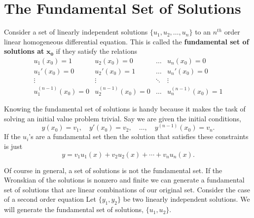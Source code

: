\section{The Fundamental Set of Solutions}
\label{section The Fundamental Set of Solutions}

Consider a set of linearly independent solutions $\{u_1, u_2, \ldots, u_n\}$  
to an $n^{t h}$ order linear 
homogeneous differential equation. 
This is called the 
\textbf{fundamental set of solutions at} $\mathbf{x_0}$ 
if they satisfy the relations
\[
\begin{matrix}
  u_1(x_0) = 1    &u_2(x_0) = 0           &\ldots         &u_n(x_0)=0 \\
  u_1'(x_0) = 0   &u_2'(x_0) = 1          &\ldots         &u_n'(x_0)=0 \\
  \vdots          &\vdots                 &\ddots         &\vdots \\
  u_1^{(n-1)}(x_0) = 0    &u_2^{(n-1)}(x_0) = 0   &\ldots &u_n^{(n-1)}(x_0)=1 
\end{matrix}
\]

Knowing the fundamental set of solutions is handy because it makes 
the task of solving an initial value problem trivial.  Say we are given the
initial conditions,
\[ y(x_0) = v_1, \quad y'(x_0) = v_2, \quad \ldots, \quad
y^{(n-1)}(x_0) = v_n.\]
If the $u_i$'s are a fundamental set then the solution that satisfies 
these constraints  is just
\[ y = v_1 u_1(x) + v_2 u_2(x) + \cdots + v_n u_n(x).\]

Of course in general, a set of solutions is not the fundamental set.
If the Wronskian of the solutions is nonzero and finite we can
generate a fundamental set of solutions that are linear combinations
of our original set.  Consider the case of a second order equation
Let $\{y_1, y_2\}$ be two linearly independent solutions.  We will
generate the fundamental set of solutions, $\{u_1, u_2\}$.

